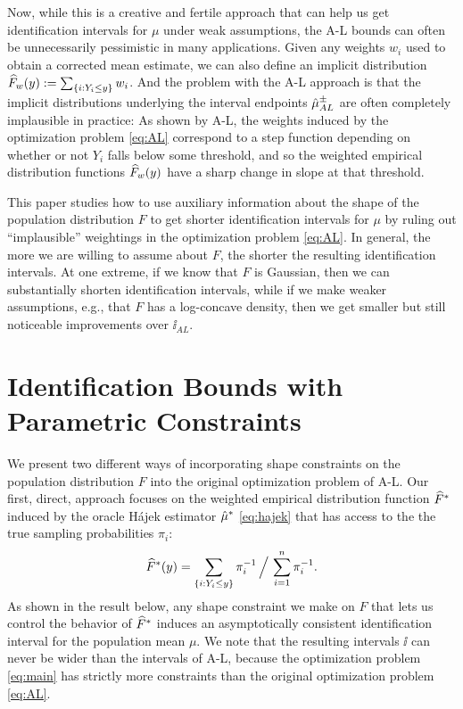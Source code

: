 \documentclass{article}
\theoremstyle{plain}
\theoremstyle{definition}
\theoremstyle{remark}
\begin{document}
Now, while this is a creative and fertile approach that can help us get identification intervals
for $\mu$ under weak assumptions, the A-L bounds can often be unnecessarily pessimistic in many
applications. Given any weights $w_i$ used to obtain a corrected mean estimate, we
can also define an implicit distribution $\widehat{F}_w(y) := \sum_{\left\{i : Y_i \leq y\right\}} w_i$.
And the problem with the A-L approach is that the implicit distributions underlying the
interval endpoints $\hat{\mu}_{AL}^{\pm}$ are often completely implausible in practice:
As shown by A-L, the weights induced by the optimization problem \eqref{eq:AL} correspond
to a step function depending on whether or not $Y_i$ falls below some threshold, and
so the weighted empirical distribution functions $\widehat{F}_w(y)$ have a sharp change in
slope at that threshold.

This paper studies how to use auxiliary information about the shape of the population
distribution $F$ to get shorter identification intervals for $\mu$ by ruling out ``implausible''
weightings in the optimization problem \eqref{eq:AL}. In general, the more we are willing to assume
about $F$, the shorter the resulting identification intervals. At one extreme, if we know that $F$
is Gaussian, then we can substantially shorten identification intervals, while if we make weaker
assumptions, e.g., that $F$ has a log-concave density, then we get smaller but still noticeable
improvements over $\ii_{AL}$.


\section{Identification Bounds with Parametric Constraints}

We present two different ways of incorporating shape constraints on the population distribution $F$
into the original optimization problem of A-L. Our first, direct, approach focuses on the weighted empirical
distribution function $\widehat{F}^*$ induced by the oracle H\'ajek estimator $\hat{\mu}^*$ \eqref{eq:hajek}
that has access to the the true sampling probabilities $\pi_i$:
\begin{equation}
\label{eq:oracle_distr}
\widehat{F}^*(y) = \sum_{\left\{i : Y_i \leq y\right\}} \pi^{-1}_i \, \Big/ \, \sum_{i = 1}^n \pi^{-1}_i.
\end{equation}
As shown in the result below, any shape constraint we make on $F$ that lets us control the
behavior of $\widehat{F}^*$ induces an asymptotically consistent identification interval for
the population mean $\mu$.
We note that the resulting intervals $\ii$ can never be wider than the intervals of
A-L, because the optimization problem \eqref{eq:main} has strictly more constraints than
the original optimization problem \eqref{eq:AL}.
\end{document}
